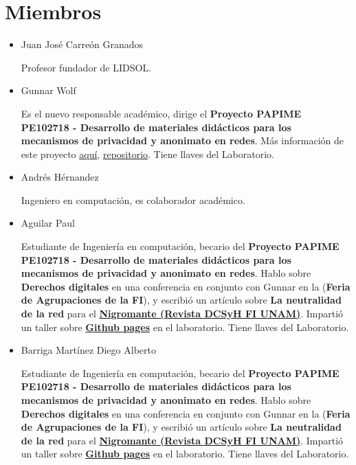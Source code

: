 \documentclass[a4paper,11pt]{article}                 %
\begin{document}
  \section{Miembros}
  \begin{itemize}
    \item Juan José Carreón Granados
    
    Profesor fundador de LIDSOL.
    
    \item Gunnar Wolf 
    
    Es el nuevo responsable académico, dirige el \textbf{Proyecto PAPIME PE102718 - Desarrollo de materiales didácticos para los mecanismos de privacidad y anonimato en redes}. Más información de este proyecto \href{https://www.priv-anon.unam.mx/}{aquí}, \href{https://github.com/LIDSOL/papime-pe102718-mecanismos-de-privacidad-y-anonimato}{repositorio}. Tiene llaves del Laboratorio.
    
    \item Andrés Hérnandez
    
    Ingeniero en computación, es colaborador académico.
    
    \item Aguilar Paul
    
    Estudiante de Ingeniería en computación, becario del \textbf{Proyecto PAPIME PE102718 - Desarrollo de materiales didácticos para los mecanismos de privacidad y anonimato en redes}. Hablo sobre \textbf{Derechos digitales} en una conferencia en conjunto con Gunnar en la (\textbf{Feria de Agrupaciones de la FI}), y escribió un artículo sobre \textbf{La neutralidad de la red} para el \href{https://issuu.com/nigromantefi}{\textbf{Nigromante  (Revista DCSyH FI  UNAM)}}. Impartió un taller sobre \href{https://github.com/umoqnier/personal-page}{\textbf{Github pages}} en el laboratorio. Tiene llaves del Laboratorio.
    
    \item Barriga Martínez Diego Alberto
    
    Estudiante de Ingeniería en computación, becario del \textbf{Proyecto PAPIME PE102718 - Desarrollo de materiales didácticos para los mecanismos de privacidad y anonimato en redes}. Hablo sobre \textbf{Derechos digitales} en una conferencia en conjunto con Gunnar en la (\textbf{Feria de Agrupaciones de la FI}), y escribió un artículo sobre \textbf{La neutralidad de la red} para el \href{https://issuu.com/nigromantefi}{\textbf{Nigromante  (Revista DCSyH FI  UNAM)}}. Impartió un taller sobre \href{https://github.com/umoqnier/personal-page}{\textbf{Github pages}} en el laboratorio. Tiene llaves del Laboratorio.
    

\end{itemize}
\end{document}
